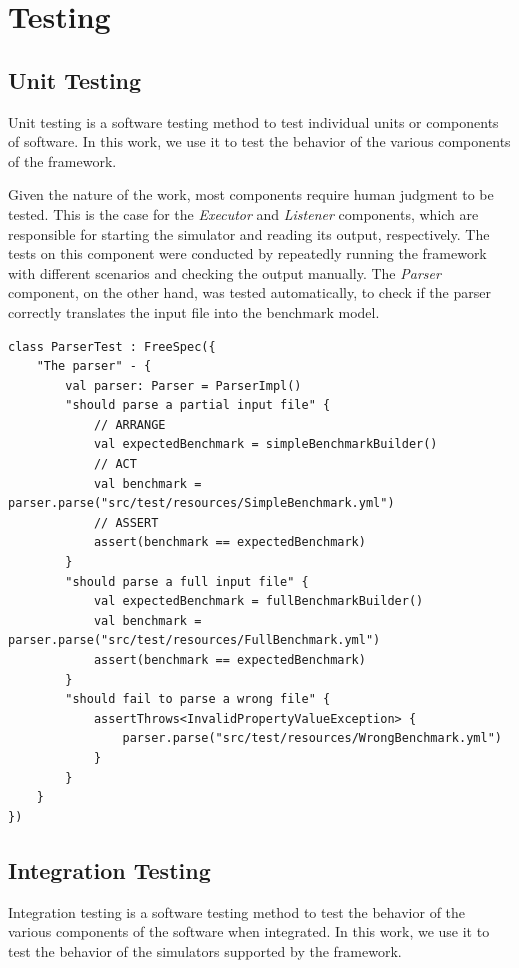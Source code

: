 \documentclass[12pt,a4paper,openright,twoside]{book}
\begin{document}
\section{Testing}

\subsection*{Unit Testing}
Unit testing is a software testing method to test individual units or components of software.
In this work, we use it to test the behavior of the various components of the framework.

Given the nature of the work, most components require human judgment to be tested. 
This is the case for the \emph{Executor} and \emph{Listener} components, which are responsible for starting the simulator and reading its output, respectively.
The tests on this component were conducted by repeatedly running the framework with different scenarios and checking the output manually.
The \emph{Parser} component, on the other hand, was tested automatically, to check if the parser correctly translates the input file into the benchmark model.

\lstset{style=my-kotlin}
\begin{lstlisting}[language=my-kotlin, caption={Parser tests}]
  class ParserTest : FreeSpec({
    "The parser" - {
        val parser: Parser = ParserImpl()
        "should parse a partial input file" {
            // ARRANGE
            val expectedBenchmark = simpleBenchmarkBuilder()
            // ACT
            val benchmark = parser.parse("src/test/resources/SimpleBenchmark.yml")
            // ASSERT
            assert(benchmark == expectedBenchmark)
        }
        "should parse a full input file" {
            val expectedBenchmark = fullBenchmarkBuilder()
            val benchmark = parser.parse("src/test/resources/FullBenchmark.yml")
            assert(benchmark == expectedBenchmark)
        }
        "should fail to parse a wrong file" {
            assertThrows<InvalidPropertyValueException> {
                parser.parse("src/test/resources/WrongBenchmark.yml")
            }
        }
    }
})
\end{lstlisting}

\subsection*{Integration Testing}

Integration testing is a software testing method to test the behavior of the various components of the software when integrated.
In this work, we use it to test the behavior of the simulators supported by the framework.
\end{document}
